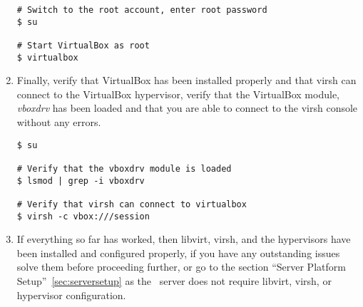 \begin{enumerate}
\lstset{language=bash,caption=Always Start VirtualBox as Root}
\begin{lstlisting}
# Switch to the root account, enter root password
$ su

# Start VirtualBox as root
$ virtualbox
\end{lstlisting}

\item	Finally, verify that VirtualBox has been installed properly and that virsh can connect to the VirtualBox hypervisor, 
		verify that the VirtualBox module, \emph{vboxdrv} has been loaded and that you are able to connect to the virsh console 
		without any errors.

\lstset{language=bash,caption=Verify that virsh can Access VirtualBox}
\begin{lstlisting}
$ su

# Verify that the vboxdrv module is loaded
$ lsmod | grep -i vboxdrv

# Verify that virsh can connect to virtualbox
$ virsh -c vbox:///session
\end{lstlisting}

\item	If everything so far has worked, then libvirt, virsh, and the hypervisors have been installed and configured properly,
		if you have any outstanding issues solve them before proceeding further, or go to the section ``Server Platform 		
		Setup''~\ref{sec:serversetup} as the \tapper~server does not require libvirt, virsh, or hypervisor configuration.

\end{enumerate}




\newpage

